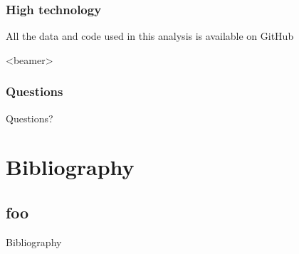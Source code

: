 \documentclass{digs-slides}
\begin{document}
\begin{frame}
    \frametitle{High technology}
    All the data and code used in this analysis is available on GitHub
\end{frame}

\begin{frame}<beamer>
    \frametitle{Questions}
    \begin{center}
        \Huge
        Questions?
    \end{center}
\end{frame}

\section{Bibliography}
\label{sec:bibliography}

\subsection*{foo}

\begin{frame}[allowframebreaks=0.9]{Bibliography}
    \printbibliography[heading=none]
\end{frame}
\end{document}

